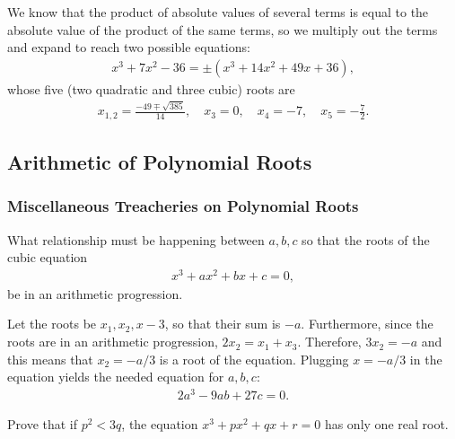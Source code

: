 \documentclass[12pt,a4paper]{memoir}
\theoremstyle{definition}
\begin{document}
\begin{solution}
	We know that the product of absolute values of several terms is equal to the absolute value of the product of the same terms, so we multiply out the terms and expand to reach two possible equations:
	\begin{align*}
		x^3 + 7x^2 - 36 = \pm(x^3 + 14x^2 +49x + 36),
	\end{align*}
	whose five (two quadratic and three cubic) roots are
	\begin{align*}
		x_{1,2}=\frac{-49\mp\sqrt{385}}{14}, \quad x_3=0, \quad x_4=-7, \quad x_5=-\frac{7}{2}.
	\end{align*}
\end{solution}

\subsection{Arithmetic of Polynomial Roots}

\subsubsection{Miscellaneous Treacheries on Polynomial Roots}

\begin{question}
	What relationship must be happening between $a,b,c$ so that the roots of the cubic equation
	\begin{align*}
		x^3+ax^2+bx+c=0,
	\end{align*}
	be in an arithmetic progression.
\end{question}

\begin{solution}
	Let the roots be $x_1,x_2,x-3$, so that their sum is $-a$. Furthermore, since the roots are in an arithmetic progression, $2x_2=x_1+x_3$. Therefore, $3x_2=-a$ and this means that $x_2=-a/3$ is a root of the equation. Plugging $x=-a/3$ in the equation yields the needed equation for $a,b,c$: 
	\begin{align*}
		2a^3-9ab+27c=0.
	\end{align*}
\end{solution}


\begin{question}
	Prove that if $p^2<3q$, the equation $x^3+px^2+qx+r=0$ has only one real root.
\end{question}
\end{document}
